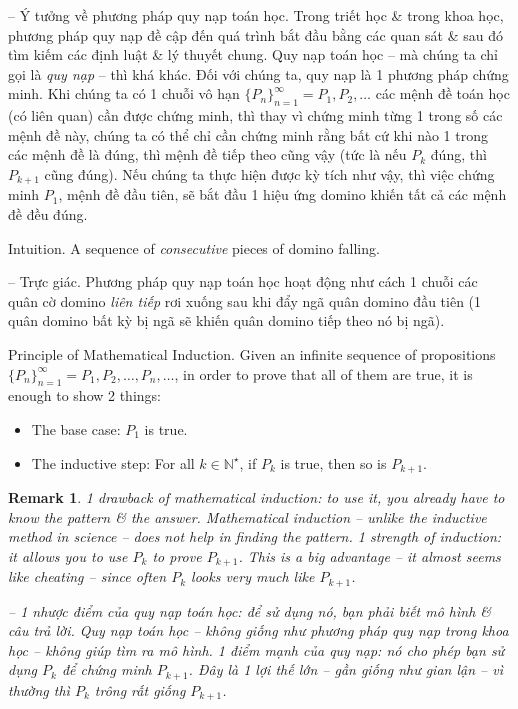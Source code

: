 \documentclass[oneside]{book}
\newtheorem{remark}{Remark}
\begin{document}
-- {\sf Ý tưởng về phương pháp quy nạp toán học.} Trong triết học \& trong khoa học, phương pháp quy nạp đề cập đến quá trình bắt đầu bằng các quan sát \& sau đó tìm kiếm các định luật \& lý thuyết chung. Quy nạp toán học -- mà chúng ta chỉ gọi là {\it quy nạp} -- thì khá khác. Đối với chúng ta, quy nạp là 1 phương pháp chứng minh. Khi chúng ta có 1 chuỗi vô hạn $\{P_n\}_{n=1}^\infty = P_1,P_2,\ldots$ các mệnh đề toán học (có liên quan) cần được chứng minh, thì thay vì chứng minh từng 1 trong số các mệnh đề này, chúng ta có thể chỉ cần chứng minh rằng bất cứ khi nào 1 trong các mệnh đề là đúng, thì mệnh đề tiếp theo cũng vậy (tức là nếu $P_k$ đúng, thì $P_{k+1}$ cũng đúng). Nếu chúng ta thực hiện được kỳ tích như vậy, thì việc chứng minh $P_1$, mệnh đề đầu tiên, sẽ bắt đầu 1 hiệu ứng domino khiến tất cả các mệnh đề đều đúng.

{\sf Intuition.} A sequence of {\it consecutive} pieces of domino falling.

-- {\sf Trực giác.} Phương pháp quy nạp toán học hoạt động như cách 1 chuỗi các quân cờ domino {\it liên tiếp} rơi xuống sau khi đẩy ngã quân domino đầu tiên (1 quân domino bất kỳ bị ngã sẽ khiến quân domino tiếp theo nó bị ngã).

{\sf Principle of Mathematical Induction.} Given an infinite sequence of propositions $\{P_n\}_{n=1}^\infty = P_1,P_2,\ldots,P_n,\ldots$, in order to prove that all of them are true, it is enough to show 2 things:
\begin{itemize}
	\item The base case: $P_1$ is true.
	\item The inductive step: For all $k\in\mathbb{N}^\star$, if $P_k$ is true, then so is $P_{k+1}$.
\end{itemize}

\begin{remark}
	1 drawback of mathematical induction: to use it, you already have to know the pattern \& the answer. Mathematical induction -- unlike the inductive method in science -- does not help in finding the pattern. 1 strength of induction: it allows you to use $P_k$ to prove $P_{k+1}$. This is a big advantage -- it almost seems like cheating -- since often $P_k$ looks very much like $P_{k+1}$.
	
	-- 1 nhược điểm của quy nạp toán học: để sử dụng nó, bạn phải biết mô hình \& câu trả lời. Quy nạp toán học -- không giống như phương pháp quy nạp trong khoa học -- không giúp tìm ra mô hình. 1 điểm mạnh của quy nạp: nó cho phép bạn sử dụng $P_k$ để chứng minh $P_{k+1}$. Đây là 1 lợi thế lớn -- gần giống như gian lận -- vì thường thì $P_k$ trông rất giống $P_{k+1}$.
\end{remark}
\end{document}
